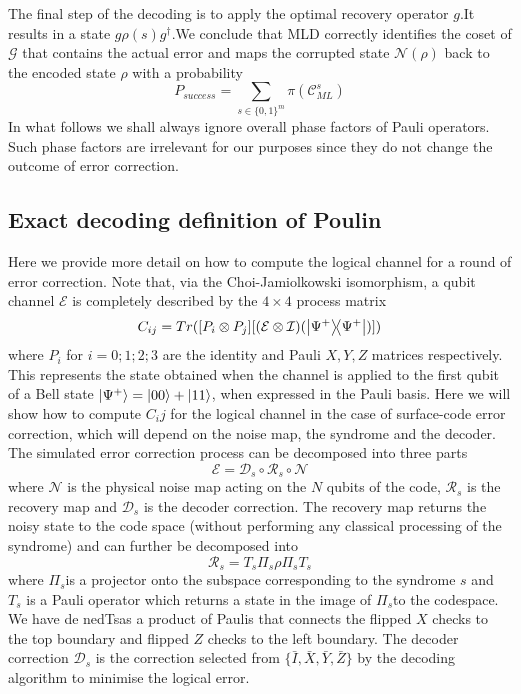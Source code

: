 The  final  step  of  the  decoding  is  to  apply  the  optimal recovery  operator \(g\).It results in a state \(g \rho(s) g^{\dag}\).We conclude that MLD correctly identifies the coset of \(\mathcal{G}\) that contains the actual error and maps the corrupted state \(\mathcal{N}(\rho)\) back to the encoded state \(\rho\) with a probability
\begin{equation*}
    P_{success} = \sum_{s \in \{0,1\}^{m}} \pi(\mathcal{C}_{ML}^{s})
\end{equation*}
In what follows we shall always ignore overall phase factors of Pauli operators.  Such phase factors are irrelevant for our purposes since they do not change the outcome of error correction.



\subsection{Exact decoding definition of Poulin}
Here we provide more detail on how to compute the logical channel for a round of error correction. Note that, via the Choi-Jamiolkowski isomorphism, a qubit channel \(\mathcal{E}\) is completely described by the \(4 \times 4\) process matrix
\begin{equation*}
    C_{ij} = Tr([P_i \otimes P_j][(\mathcal{E} \otimes \mathcal{I})(\ketbra{\Psi^{+}}{\Psi^{+}})])
\end{equation*}
where \(P_i\) for \(i = 0;1;2;3\) are the identity and Pauli \(X, Y, Z\) matrices respectively. This represents the state obtained when the channel is applied to the first qubit of a Bell state \(\ket{\Psi^{+}} = \ket{00} + \ket{11}\), when expressed in the Pauli basis. Here we will show how to compute \(C_ij\) for the logical channel in the case of surface-code error correction, which will depend on the noise map, the syndrome and the decoder. The simulated error correction process can be decomposed into three parts
\begin{equation*}
    \mathcal{E} = \mathcal{D}_s \circ \mathcal{R}_s \circ \mathcal{N}
\end{equation*}
where \(\mathcal{N}\) is the physical noise map acting on the \(N\) qubits of the code, \(\mathcal{R}_s\) is the recovery map and \(\mathcal{D}_s\) is the decoder correction. The recovery map returns the noisy state to the code space (without performing any classical processing of the syndrome) and can further be decomposed into
\begin{equation*}
    \mathcal{R}_s = T_s \Pi_s \rho \Pi_s T_s
\end{equation*}
where \(\Pi_s\)is a projector onto the subspace corresponding to the syndrome \(s\) and \(T_s\) is a Pauli operator which returns a state in the image of \(\Pi_s\)to the codespace. We have de nedTsas a product of Paulis that connects the flipped \(X\) checks to the top boundary and  flipped \(Z\) checks to the left boundary. The decoder correction \(\mathcal{D}_s\) is the correction selected from \(\{\bar{I}, \bar{X}, \bar{Y}, \bar{Z}\}\) by the decoding algorithm to minimise the logical error.

